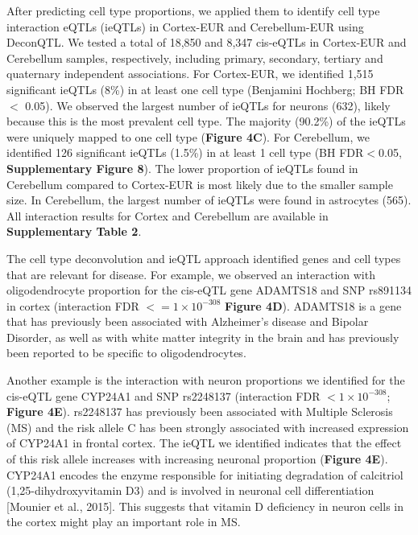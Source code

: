 {{After predicting cell type proportions, we applied them to identify cell type interaction eQTLs (ieQTLs) in Cortex-EUR and Cerebellum-EUR using DeconQTL\cite{raulaguirregamboaDeconvolutionBulkBlood2020}. We tested a total of 18,850 and 8,347 cis-eQTLs in Cortex-EUR and Cerebellum samples, respectively, including primary, secondary, tertiary and quaternary independent associations. For Cortex-EUR, we identified 1,515 significant ieQTLs (8\%) in at least one cell type (Benjamini Hochberg; BH FDR $<$ 0.05). We observed the largest number of ieQTLs for neurons (632), likely because this is the most prevalent cell type. The majority (90.2\%) of the ieQTLs were uniquely mapped to one cell type (\textbf{Figure 4C}).  For Cerebellum, we identified 126 significant ieQTLs (1.5\%) in at least 1 cell type (BH FDR$<$0.05, \textbf{Supplementary Figure 8}). The lower proportion of ieQTLs found in Cerebellum compared to Cortex-EUR is most likely due to the smaller sample size. In Cerebellum, the largest number of ieQTLs were found in astrocytes (565). All interaction results for Cortex and Cerebellum are available in \textbf{Supplementary Table 2}. 

The cell type deconvolution and ieQTL approach identified genes and cell types that are relevant for disease. For example, we observed an interaction with oligodendrocyte proportion for the cis-eQTL gene ADAMTS18 and SNP rs891134 in cortex (interaction FDR $<= 1 \times 10^{-308}$ \textbf{Figure 4D}). ADAMTS18 is a gene that has previously been associated with Alzheimer’s disease and Bipolar Disorder, as well as with white matter integrity in the brain\cite{lopezGenomewideSearchGenetic2012} and has previously been reported to be specific to oligodendrocytes\cite{grubmanSinglecellAtlasEntorhinal2019}.  

Another example is the interaction with neuron proportions we identified for the cis-eQTL gene CYP24A1 and SNP rs2248137 (interaction FDR $< 1 \times 10^{-308}$; \textbf{Figure 4E}). rs2248137 has previously been associated with Multiple Sclerosis (MS)\cite{consortium*+MultipleSclerosisGenomic2019} and the risk allele C has been strongly associated with increased expression of CYP24A1 in frontal cortex\cite{ramasamyGeneticEvidencePathogenic2014}. The ieQTL we identified indicates that the effect of this risk allele increases with increasing neuronal proportion (\textbf{Figure 4E}). CYP24A1 encodes the enzyme responsible for initiating degradation of calcitriol (1,25-dihydroxyvitamin D3) and is involved in neuronal cell differentiation [Mounier et al., 2015]. This suggests that vitamin D deficiency in neuron cells in the cortex might play an important role in MS.  

}}
